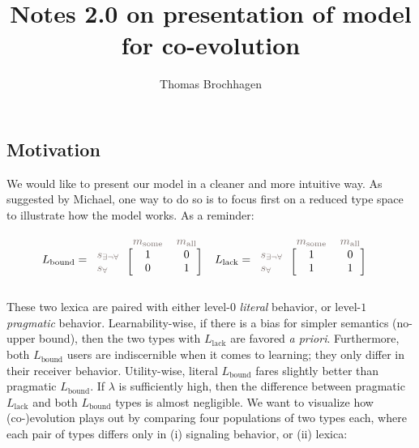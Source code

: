 \documentclass[fleqn,reqno,10pt]{article}
\title{Notes 2.0 on presentation of model for co-evolution}
\author{Thomas Brochhagen}
\date{}
\newcommand{\mylang}[1]{\ensuremath{L_{\text{#1}}}\xspace} %
\newcommand{\mystate}[1]{\ensuremath{\state_{\text{#1}}}\xspace} %
\newcommand{\mymessg}[1]{\ensuremath{\messg_{\text{#1}}}\xspace} %
\newcommand{\messg}{\ensuremath{m}\xspace}		%
\newcommand{\state}{\ensuremath{s}\xspace}		%
\newcommand{\Lbound}{\mylang{bound}}
\newcommand{\Llack}{\mylang{lack}}
\newcommand{\ssome}{\mystate{\ensuremath{\exists\neg\forall}}}
\newcommand{\sall}{\mystate{\ensuremath{\forall}}}
\newcommand{\msome}{\mymessg{some}}
\newcommand{\mall}{\mymessg{all}}
\newcommand{\mygray}[1]{{\textcolor{mygray}{#1}}}
\begin{document}
\maketitle

\subsection*{Motivation}

We would like to present our model in a cleaner and more intuitive way. As suggested by Michael, one way to do so is to focus first on a reduced type space to illustrate how the model works. As a reminder:

\begin{align*}
  \Lbound & = \begin{blockarray}{lcc}
    & \mygray{\msome} & \mygray{\mall} \\
    \begin{block}{l[cc]}
      \mygray{\ssome} & 1 & 0 \\
      \mygray{\sall}  & 0 & 1 \\
    \end{block}
  \end{blockarray} &
  \Llack & = \begin{blockarray}{lcc}
    & \mygray{\msome} & \mygray{\mall} \\
    \begin{block}{l[cc]}
      \mygray{\ssome} & 1 & 0 \\
      \mygray{\sall}  & 1 & 1 \\
    \end{block}
  \end{blockarray}
\end{align*}

These two lexica are paired with either level-$0$ {\em literal} behavior, or level-$1$ {\em pragmatic} behavior. Learnability-wise, if there is a bias for simpler semantics (no-upper bound), then the two types with $\Llack$ are favored {\em a priori}. Furthermore, both $\Lbound$ users are indiscernible when it comes to learning; they only differ in their receiver behavior. Utility-wise, literal $\Lbound$ fares slightly better than pragmatic $\Lbound$. If $\lambda$ is sufficiently high, then the difference between pragmatic $\Llack$ and both $\Lbound$ types is almost negligible. We want to visualize how (co-)evolution plays out by comparing four populations of two types each, where each pair of types differs only in (i) signaling behavior, or (ii) lexica:
\end{document}
